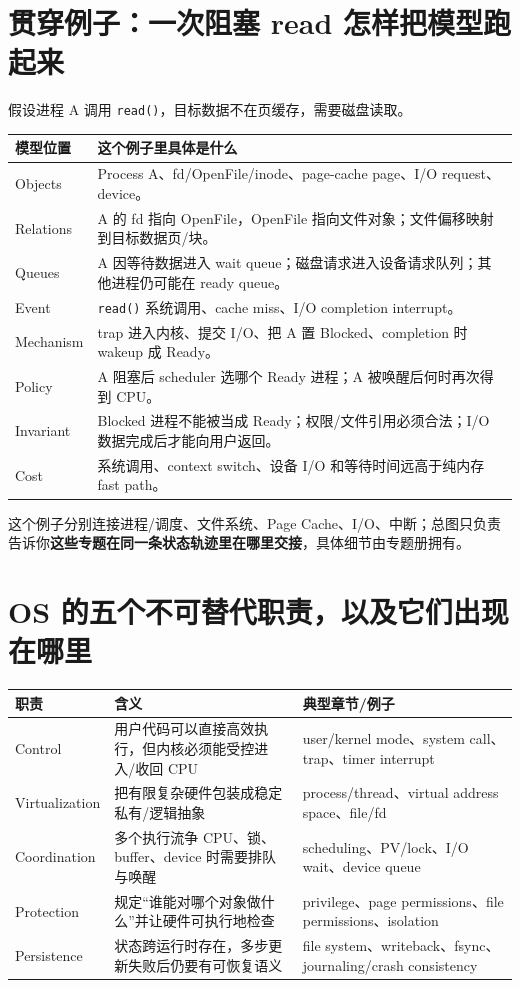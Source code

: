 \documentclass[11pt,a4paper,openany]{ctexbook}
\newcommand{\key}[1]{\textbf{\color{deep}#1}}
\begin{document}
\section{贯穿例子：一次阻塞 read 怎样把模型跑起来}
假设进程 A 调用 \texttt{read()}，目标数据不在页缓存，需要磁盘读取。

\begin{longtable}{L{3.0cm}L{\dimexpr\linewidth-3.85cm\relax}}
\toprule
\textbf{模型位置} & \textbf{这个例子里具体是什么}\\
\midrule
Objects & Process A、fd/OpenFile/inode、page-cache page、I/O request、device。\\
Relations & A 的 fd 指向 OpenFile，OpenFile 指向文件对象；文件偏移映射到目标数据页/块。\\
Queues & A 因等待数据进入 wait queue；磁盘请求进入设备请求队列；其他进程仍可能在 ready queue。\\
Event & \texttt{read()} 系统调用、cache miss、I/O completion interrupt。\\
Mechanism & trap 进入内核、提交 I/O、把 A 置 Blocked、completion 时 wakeup 成 Ready。\\
Policy & A 阻塞后 scheduler 选哪个 Ready 进程；A 被唤醒后何时再次得到 CPU。\\
Invariant & Blocked 进程不能被当成 Ready；权限/文件引用必须合法；I/O 数据完成后才能向用户返回。\\
Cost & 系统调用、context switch、设备 I/O 和等待时间远高于纯内存 fast path。\\
\bottomrule
\end{longtable}

这个例子分别连接进程/调度、文件系统、Page Cache、I/O、中断；总图只负责告诉你\key{这些专题在同一条状态轨迹里在哪里交接}，具体细节由专题册拥有。

\section{OS 的五个不可替代职责，以及它们出现在哪里}
\begin{longtable}{L{2.8cm}L{5.0cm}L{\dimexpr\linewidth-9.07cm\relax}}
\toprule
\textbf{职责} & \textbf{含义} & \textbf{典型章节/例子}\\
\midrule
Control & 用户代码可以直接高效执行，但内核必须能受控进入/收回 CPU & user/kernel mode、system call、trap、timer interrupt \\
Virtualization & 把有限复杂硬件包装成稳定私有/逻辑抽象 & process/thread、virtual address space、file/fd \\
Coordination & 多个执行流争 CPU、锁、buffer、device 时需要排队与唤醒 & scheduling、PV/lock、I/O wait、device queue \\
Protection & 规定“谁能对哪个对象做什么”并让硬件可执行地检查 & privilege、page permissions、file permissions、isolation \\
Persistence & 状态跨运行时存在，多步更新失败后仍要有可恢复语义 & file system、writeback、fsync、journaling/crash consistency \\
\bottomrule
\end{longtable}
\end{document}
